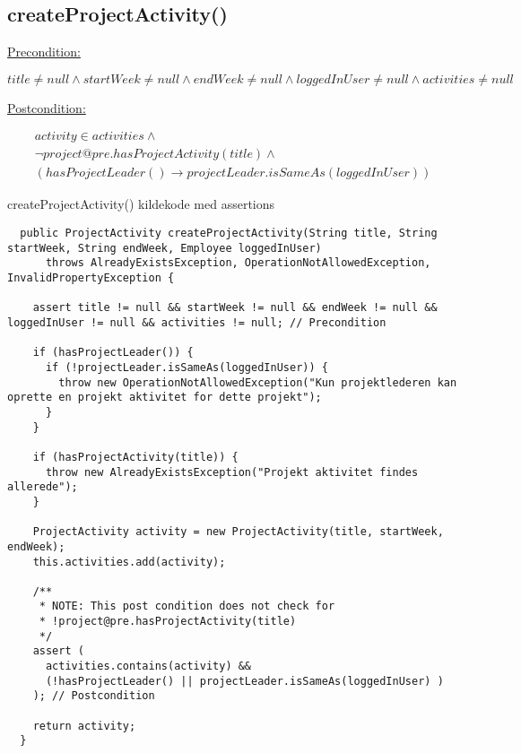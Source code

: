 \subsection{createProjectActivity()}\label{sec:contract_create_project_activity}
\underline{Precondition:}
\vspace{4pt}

\begin{equation}
  title \neq null \wedge startWeek \neq null \wedge endWeek \neq null \wedge loggedInUser \neq null \wedge activities \neq null
\end{equation}
\vspace{4pt}

\noindent
\underline{Postcondition:}
\vspace{4pt}

\begin{equation}
  \begin{gathered}
    activity \in activities \wedge \\
    \neg project@pre.hasProjectActivity(title) \wedge \\
    (hasProjectLeader() \to projectLeader.isSameAs(loggedInUser))
  \end{gathered}
\end{equation}


\begin{listing}[H]
  \centering
  \caption{createProjectActivity() kildekode med assertions}\label{lst:create_project_activity_assertions}
  \begin{verbatim}
  public ProjectActivity createProjectActivity(String title, String startWeek, String endWeek, Employee loggedInUser)
      throws AlreadyExistsException, OperationNotAllowedException, InvalidPropertyException {

    assert title != null && startWeek != null && endWeek != null && loggedInUser != null && activities != null; // Precondition

    if (hasProjectLeader()) {
      if (!projectLeader.isSameAs(loggedInUser)) {
        throw new OperationNotAllowedException("Kun projektlederen kan oprette en projekt aktivitet for dette projekt");
      }
    }

    if (hasProjectActivity(title)) {
      throw new AlreadyExistsException("Projekt aktivitet findes allerede");
    }

    ProjectActivity activity = new ProjectActivity(title, startWeek, endWeek);
    this.activities.add(activity);

    /**
     * NOTE: This post condition does not check for 
     * !project@pre.hasProjectActivity(title)
     */
    assert (
      activities.contains(activity) &&
      (!hasProjectLeader() || projectLeader.isSameAs(loggedInUser) )
    ); // Postcondition

    return activity;
  }
    \end{verbatim}
\end{listing}
